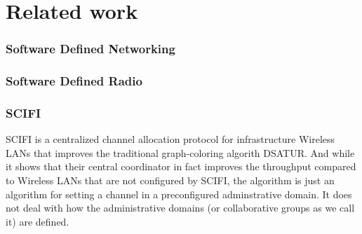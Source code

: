 \chapter{Related work}


\subsection{Software Defined Networking}
\subsection{Software Defined Radio}
\subsection{SCIFI} SCIFI \cite{SCIFI} is a centralized channel allocation protocol for infrastructure Wireless LANs that improves the traditional graph-coloring algorith DSATUR. 
		And while it shows that their central coordinator in fact improves the throughput compared to Wireless LANs that are not configured by SCIFI, the algorithm is just an algorithm for setting 
		a channel in a preconfigured adminstrative domain. It does not deal with how the administrative domains (or collaborative groups as we call it) are defined. 


